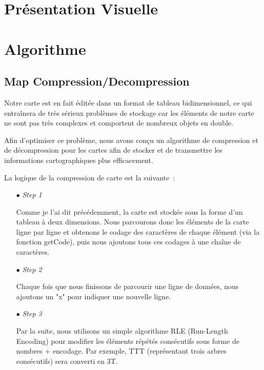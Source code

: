 \documentclass[11pt,english]{article}
\begin{document}
\pagebreak

\section{Présentation Visuelle}

\indent



\section{Algorithme}

\subsection{Map Compression/Decompression}

\indent

Notre carte est en fait éditée dans un format de tableau bidimensionnel, ce qui entraînera de très sérieux problèmes de stockage car les éléments de notre carte ne sont pas très complexes et comportent de nombreux objets en double.

\indent Afin d'optimiser ce problème, nous avons conçu un algorithme de compression et de décompression pour les cartes afin de stocker et de transmettre les informations cartographiques plus efficacement.

\indent La logique de la compression de carte est la suivante :

\small
{
\begin{itemize}
    \item [$\bullet$] \textit{Step 1}
    
    Comme je l'ai dit précédemment, la carte est stockée sous la forme d'un tableau à deux dimensions. Nous parcourons donc les éléments de la carte ligne par ligne et obtenons le codage des caractères de chaque élément (via la fonction getCode), puis nous ajoutons tous ces codages à une chaîne de caractères.

    \item [$\bullet$] \textit{Step 2}
    
    Chaque fois que nous finissons de parcourir une ligne de données, nous ajoutons un "x" pour indiquer une nouvelle ligne.

    \item [$\bullet$] \textit{Step 3}
    
    Par la suite, nous utilisons un simple algorithme RLE (Run-Length Encoding) pour modifier les éléments répétés consécutifs sous forme de nombres + encodage. Par exemple, TTT (représentant trois arbres consécutifs) sera converti en 3T.

\end{itemize}
}
\end{document}
